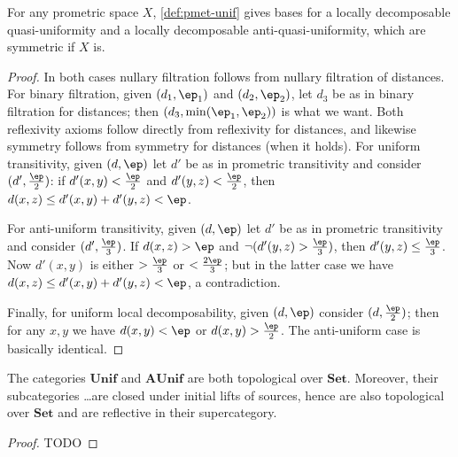 \documentclass{article}
\def\hfep{\frac{\ep}{2}}
\def\fep#1#2{\frac{\if1#1\else#1\fi\ep}{#2}}
\def\Set{\mathbf{Set}}
\def\Unif{\mathbf{Unif}}
\def\AUnif{\mathbf{AUnif}}
\begin{document}
\begin{thm}\label{thm:pmet-unif}
  For any prometric space $X$, \cref{def:pmet-unif} gives bases for a locally decomposable quasi-uniformity and a locally decomposable anti-quasi-uniformity, which are symmetric if $X$ is.
\end{thm}
\begin{proof}
  In both cases nullary filtration follows from nullary filtration of distances.
  For binary filtration, given $(d_1,\ep_1)$ and $(d_2,\ep_2)$, let $d_3$ be as in binary filtration for distances; then $(d_3,\min(\ep_1,\ep_2))$ is what we want.
  Both reflexivity axioms follow directly from reflexivity for distances, and likewise symmetry follows from symmetry for distances (when it holds).
  For uniform transitivity, given $(d,\ep)$ let $d'$ be as in prometric transitivity and consider $(d',\hfep)$: if $d'(x,y)<\hfep$ and $d'(y,z)<\hfep$, then $d(x,z) \le d'(x,y)+d'(y,z)<\ep$.

  For anti-uniform transitivity, given $(d,\ep)$ let $d'$ be as in prometric transitivity and consider $(d',\fep13)$.
  If $d(x,z)>\ep$ and $\neg (d'(y,z)>\fep13)$, then $d'(y,z)\le \fep13$.
  Now $d'(x,y)$ is either $>\fep13$ or $<\fep23$; but in the latter case we have $d(x,z) \le d'(x,y)+d'(y,z) < \ep$, a contradiction.

  Finally, for uniform local decomposability, given $(d,\ep)$ consider $(d,\hfep)$;
  then for any $x,y$ we have $d(x,y)<\ep$ or $d(x,y)>\hfep$.
  The anti-uniform case is basically identical.
\end{proof}

\begin{thm}
  The categories $\Unif$ and $\AUnif$ are both topological over $\Set$.
  Moreover, their subcategories \dots are closed under initial lifts of sources, hence are also topological over $\Set$ and are reflective in their supercategory.
\end{thm}
\begin{proof}
  TODO
\end{proof}
\end{document}
